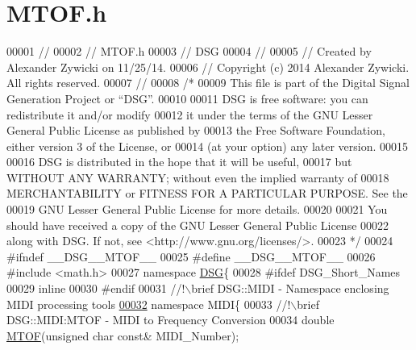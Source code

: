 \hypertarget{_m_t_o_f_8h_source}{\section{M\+T\+O\+F.\+h}
\label{_m_t_o_f_8h_source}
}

\begin{DoxyCode}
00001 \textcolor{comment}{//}
00002 \textcolor{comment}{//  MTOF.h}
00003 \textcolor{comment}{//  DSG}
00004 \textcolor{comment}{//}
00005 \textcolor{comment}{//  Created by Alexander Zywicki on 11/25/14.}
00006 \textcolor{comment}{//  Copyright (c) 2014 Alexander Zywicki. All rights reserved.}
00007 \textcolor{comment}{//}
00008 \textcolor{comment}{/*}
00009 \textcolor{comment}{ This file is part of the Digital Signal Generation Project or “DSG”.}
00010 \textcolor{comment}{}
00011 \textcolor{comment}{ DSG is free software: you can redistribute it and/or modify}
00012 \textcolor{comment}{ it under the terms of the GNU Lesser General Public License as published by}
00013 \textcolor{comment}{ the Free Software Foundation, either version 3 of the License, or}
00014 \textcolor{comment}{ (at your option) any later version.}
00015 \textcolor{comment}{}
00016 \textcolor{comment}{ DSG is distributed in the hope that it will be useful,}
00017 \textcolor{comment}{ but WITHOUT ANY WARRANTY; without even the implied warranty of}
00018 \textcolor{comment}{ MERCHANTABILITY or FITNESS FOR A PARTICULAR PURPOSE.  See the}
00019 \textcolor{comment}{ GNU Lesser General Public License for more details.}
00020 \textcolor{comment}{}
00021 \textcolor{comment}{ You should have received a copy of the GNU Lesser General Public License}
00022 \textcolor{comment}{ along with DSG.  If not, see <http://www.gnu.org/licenses/>.}
00023 \textcolor{comment}{ */}
00024 \textcolor{preprocessor}{#ifndef \_\_DSG\_\_MTOF\_\_}
00025 \textcolor{preprocessor}{#define \_\_DSG\_\_MTOF\_\_}
00026 \textcolor{preprocessor}{#include <math.h>}
00027 \textcolor{keyword}{namespace }\hyperlink{namespace_d_s_g}{DSG}\{
00028 \textcolor{preprocessor}{#ifdef DSG\_Short\_Names}
00029     \textcolor{keyword}{inline}
00030 \textcolor{preprocessor}{#endif}
00031 \textcolor{comment}{    //!\(\backslash\)brief DSG::MIDI - Namespace enclosing MIDI processing tools}
\hypertarget{_m_t_o_f_8h_source_l00032}{}\hyperlink{namespace_d_s_g_1_1_m_i_d_i}{00032} \textcolor{comment}{}    \textcolor{keyword}{namespace }MIDI\{\textcolor{comment}{}
00033 \textcolor{comment}{        //!\(\backslash\)brief DSG::MIDI:MTOF - MIDI to Frequency Conversion}
00034 \textcolor{comment}{}        \textcolor{keywordtype}{double}   \hyperlink{namespace_d_s_g_1_1_m_i_d_i_af0ba40e3fd85269f6f69d0418fbbaea8}{MTOF}(\textcolor{keywordtype}{unsigned} \textcolor{keywordtype}{char} \textcolor{keyword}{const}& MIDI\_Number);\textcolor{comment}{}

\end{DoxyCode}
